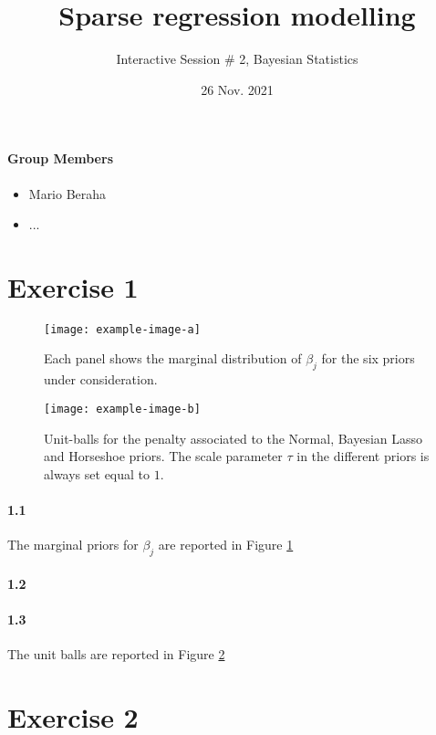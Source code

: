 \documentclass[12pt]{article}
\title{Sparse regression modelling}
\author{Interactive Session \# 2, Bayesian Statistics}
\date{26 Nov. 2021}
\begin{document}
\maketitle

\paragraph{Group Members}

\begin{itemize}
\item Mario Beraha
\item ...
\end{itemize}

\section*{Exercise 1}

\begin{figure}
\texttt{[image: example-image-a]}
\caption{Each panel shows the marginal distribution of $\beta_j$ for the six priors under consideration.}
\label{fig:priors}
\end{figure}

\begin{figure}
\texttt{[image: example-image-b]}
\caption{Unit-balls for the penalty associated to the Normal, Bayesian Lasso and Horseshoe priors. The scale parameter $\tau$ in the different priors is always set equal to $1$.}
\label{fig:balls}
\end{figure}

\paragraph{1.1} The marginal priors for $\beta_j$ are reported in Figure \ref{fig:priors}

\paragraph{1.2} 

\paragraph{1.3} The unit balls are reported in Figure \ref{fig:balls} 

\section*{Exercise 2}
\end{document}
